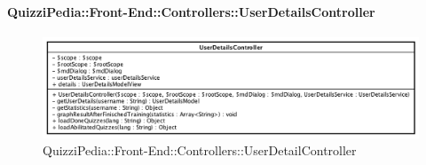 \paragraph{QuizziPedia::Front-End::Controllers::UserDetailsController}
\begin{figure} [ht]
	\centering
	\includegraphics[scale=0.5]{UML/Classi/Front-End/QuizziPedia_Front-end_Controller_UserDetailController.png}
	\caption{QuizziPedia::Front-End::Controllers::UserDetailController}
\end{figure} \FloatBarrier
